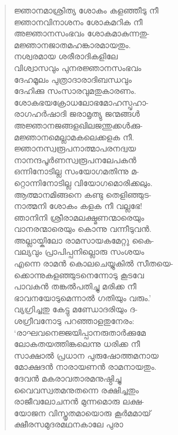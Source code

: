 \begin{verse}
ജ്ഞാനമാശ്രിത്യ ശോകം കളഞ്ഞീടു നീ\\
ജ്ഞാനവിനാശനം ശോകമറിക നീ\\
അജ്ഞാനസംഭവം ശോകമാകുന്നതു-\\
മജ്ഞാനജാതമഹങ്കാരമായതും.\\
നശ്വരമായ ശരീരാദികളിലേ\\
വിശ്വാസവും പുനരജ്ഞാനസംഭവം\\
ദേഹമൂലം പുത്രാദാരാദിബന്ധവും\\
ദേഹിക്കു സംസാരവുമതുകാരണം.\\
ശോകഭയക്രോധലോഭമോഹസ്പൃഹാ-\\
രാഗഹര്‍ഷാദി ജരാമൃത്യു ജന്മങ്ങള്‍\\
അജ്ഞാനജങ്ങളഖിലജന്തുക്കള്‍ക്കു-\\
മജ്ഞാനമെല്ലാമകലെക്കളക നീ.\\
ജ്ഞാനസ്വരൂപനാത്മാപരനദ്വയ\\
നാനന്ദപൂര്‍ണസ്വരൂപനലേപകന്‍\\
ഒന്നിനോടില്ല സംയോഗമതിന്നു മ-\\
റ്റൊന്നിനോടില്ല വിയോഗമൊരിക്കലും.\\
ആത്മാനമിങ്ങനെ കണ്ടു തെളിഞ്ഞുട-\\
നാത്മനി ശോകം കളക നീ വല്ലഭേ!\\
ഞാനിനി ശ്രീരാമലക്ഷ്മണന്മാരെയും\\
വാനരന്മാരെയും കൊന്നു വന്നീടുവന്‍.\\
അല്ലായ്കിലോ രാമസായകമേറ്റു കൈ-\\
വല്യവും പ്രാപിപ്പനില്ലൊരു സംശയം\\
എന്നെ രാമന്‍ കൊലചെയ്യുകില്‍ സീതയെ-\\
ക്കൊന്നുകളഞ്ഞുടനെന്നോടു കൂടവേ\\
പാവകന്‍ തങ്കല്‍പതിച്ചു മരിക്ക നീ\\
ഭാവനയോടുമെന്നാല്‍ ഗതിയും വരും.’\\
വ്യഗ്രിച്ചതു കേട്ടു മണ്ഡോദരിയും ദ-\\
ശഗ്രീവനോടു പറഞ്ഞാളതുനേരം:\\
‘രാഘവനെജ്ജയിപ്പാനരുതാര്‍ക്കുമേ\\
ലോകതയത്തിങ്കലെന്നു ധരിക്ക നീ\\
സാക്ഷാല്‍ പ്രധാന പുരുഷോത്തമനായ\\
മോക്ഷദന്‍ നാരായണന്‍ രാമനായതും.\\
ദേവന്‍ മകരാവതാരമനുഷ്ഠിച്ചു\\
വൈവസ്വതമനുതന്നെ രക്ഷിച്ചതും\\
രാജീവലോചനന്‍ മുന്നമൊരു ലക്ഷ-\\
യോജന വിസ്തൃതമായൊരു കൂര്‍മമായ്\\
ക്ഷീരസമുദരമഥനകാലേ പുരാ\\

\end{verse}
